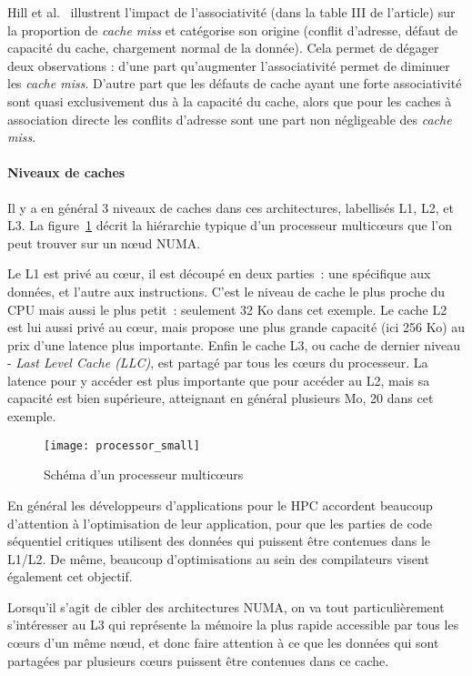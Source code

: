 Hill et al.~\cite{Hill1989} illustrent l'impact de l'associativité (dans la table III de l'article) sur la proportion de \emph{cache miss} et catégorise son origine (conflit d'adresse, défaut de capacité du cache, chargement normal de la donnée).
Cela permet de dégager deux observations : d'une part qu'augmenter l'associativité permet de diminuer les \emph{cache miss}.
D'autre part que les défauts de cache ayant une forte associativité sont quasi exclusivement dus à la capacité du cache, alors que pour les caches à association directe les conflits d'adresse sont une part non négligeable des \emph{cache miss}.

\paragraph{Niveaux de caches}

Il y a en général 3 niveaux de caches dans ces architectures, labellisés L1, L2, et L3.
La figure~\ref{fig:context:schema-caches} décrit la hiérarchie typique d'un processeur multicœurs que l'on peut trouver sur un nœud NUMA.

Le L1 est privé au cœur, il est découpé en deux parties~: une spécifique aux données, et l'autre aux instructions. C'est le niveau de cache le plus proche du CPU mais aussi le plus petit~: seulement 32 Ko dans cet exemple.
Le cache L2 est lui aussi privé au cœur, mais propose une plus grande capacité (ici 256 Ko) au prix d'une latence plus importante.
Enfin le cache L3, ou cache de dernier niveau - \emph{Last Level Cache (LLC)}, est partagé par tous les cœurs du processeur. La latence pour y accéder est plus importante que pour accéder au L2, mais sa capacité est bien supérieure, atteignant en général plusieurs Mo, 20 dans cet exemple.

\begin{figure}[ht]
  \centering
  \texttt{[image: processor\_small]}
  \caption{Schéma d'un processeur multicœurs}\label{fig:context:schema-caches}
\end{figure}

En général les développeurs d'applications pour le HPC accordent beaucoup d'attention à l'optimisation de leur application, pour que les parties de code séquentiel critiques utilisent des données qui puissent être contenues dans le L1/L2.
De même, beaucoup d'optimisations au sein des compilateurs visent également cet objectif.

Lorsqu'il s'agit de cibler des architectures NUMA, on va tout particulièrement s'intéresser au L3 qui représente la mémoire la plus rapide accessible par tous les cœurs d'un même nœud, et donc faire attention à ce que les données qui sont partagées par plusieurs cœurs puissent être contenues dans ce cache.

